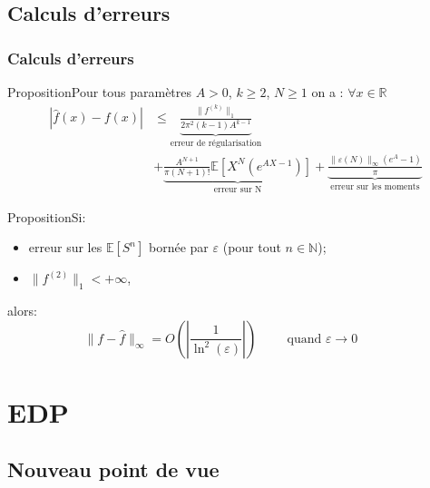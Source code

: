 \documentclass{beamer}
\newcommand{\prop}[1]{\begin{block}{Proposition}#1\end{block}}
\newcommand{\pth}[1]{\left(#1\right)}
\newcommand{\cro}[1]{\left[#1\right]}
\newcommand{\abs}[1]{\left|#1\right|}
\newcommand{\dabs}[1]{\|#1\|}
\newcommand{\comment}[1]{\hspace{1cm}\text{#1}\hspace{1cm}}
\newcommand{\Er}{\mathbb{R}}
\newcommand{\En}{\mathbb{N}}
\newcommand{\Esp}[1]{\mathbb{E}\cro{#1}}
\begin{document}
\subsection{Calculs d'erreurs}

\begin{frame}[allowframebreaks]
  \frametitle{Calculs d'erreurs}
  \prop{Pour tous paramètres $A>0$, $k\geqslant 2$, $N\geqslant 1$ on a : $\forall x\in\Er$
    \begin{align*}
      \abs{\hat{f}(x)-f(x)}&\leqslant\underbrace{\frac{\dabs{f^{(k)}}_1}{2\pi^2(k-1)A^{k-1}}}_{\text{erreur de régularisation}}\\
      &+\underbrace{\frac{A^{N+1}}{\pi(N+1)!}\Esp{X^N(e^{AX-1})}}_{\text{erreur sur N}}+\underbrace{\frac{\dabs{\varepsilon(N)}_{\infty}(e^A-1)}{\pi}}_{\text{erreur sur les moments}}
    \end{align*}
    
    }
  \prop{Si:
    \begin{itemize}[label=$\bullet$]
    \item erreur sur les $\Esp{S^n}$ bornée par $\varepsilon$ (pour tout $n\in\En$);
    \item$\dabs{f^{(2)}}_1<+\infty$,
    \end{itemize}
    alors:
    \[\dabs{f-\hat{f}}_{\infty}=O\pth{\abs{\frac{1}{\ln^2(\varepsilon)}}}\comment{quand $\varepsilon\to 0$}\]
    }

\end{frame}

\section{EDP}

\begin{frame}
  \sectionpage
\end{frame}

\subsection{Nouveau point de vue}
\end{document}
